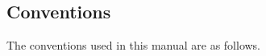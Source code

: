 \newcommand{\toolboxfour}[4]{%
\raisebox{-6pt}{%
\shadowbox{%
\texttt{[image: \#1]}%
\texttt{[image: \#2]}%
\texttt{[image: \#3]}%
 \guilabel{#4}%
}}}
\newcommand{\toolbox}[2]{%
\toolboxtwo{#1}{#2}%
}
\newcommand{\tab}[1]{%
\raisebox{-6pt}{%
\shadowbox{\guilabel{#1}}
}}
\newcommand{\checkbox}[1]{%
\raisebox{2pt}{%
\fbox{%
\raisebox{-4pt}{%
\shadowbox{x}} %
\guilabel{#1}}%
}}
\newcommand{\radiobuttonoff}[1]{%
\raisebox{-4pt}{%
\setlength{\fboxsep}{1pt}%
\shadowbox{%
$\bigcirc$%
}} %
\guilabel{#1}%
}
\newcommand{\radiobuttonon}[1]{%
$\odot$ %
\guilabel{#1}%
}
\newcommand{\selectnumber}[2]{%
\fbox{%
{#1} \fbox{{#2} %
\raisebox{-6pt}{%
\setlength{\fboxsep}{1pt}%
\shadowbox{%
${\blacktriangle}\atop{\blacktriangledown}$%
}}}}}
%
\newcommand{\selectstring}[2]{%
\fbox{%
\guilabel{#1} \fbox{\guilabel{#2} %
\raisebox{-2pt}{%
\setlength{\fboxsep}{1pt}%
\shadowbox{%
$\blacktriangledown$%
}}}}}
%
\newcommand{\browsebutton}{%
\raisebox{-6pt}{%
\shadowbox{\rule[-1mm]{0mm}{4mm}{$\ldots$}}
}}
%
\newcommand{\selectcolor}[2]{%
\fbox{\guilabel{#1} %
\raisebox{-6pt}{%
\setlength{\fboxsep}{0pt}%
\shadowbox{\setlength{\fboxsep}{2pt}%
\fcolorbox{#2}{#2}{\rule{0mm}{5mm}\rule{35mm}{0mm}%
}}}}}
%
\newcommand{\slider}[3]{%
\fbox{%
\guilabel{#1} \guilabel{#2}\% %
\raisebox{-2pt}{%
\setlength{\fboxsep}{1pt}%
\shadowbox{%
$\triangledown$%
}}%
\negthinspace\rule[1mm]{20mm}{1mm}
}}
%
\newcommand{\inputtext}[2]{%
\fbox{%
\guilabel{#1} %
\raisebox{-6pt}{%
\shadowbox{\usertext{#2}}%
}}}
%
%
\subsection{Conventions}\label{label_conventions}

The conventions used in this manual are as follows. 

